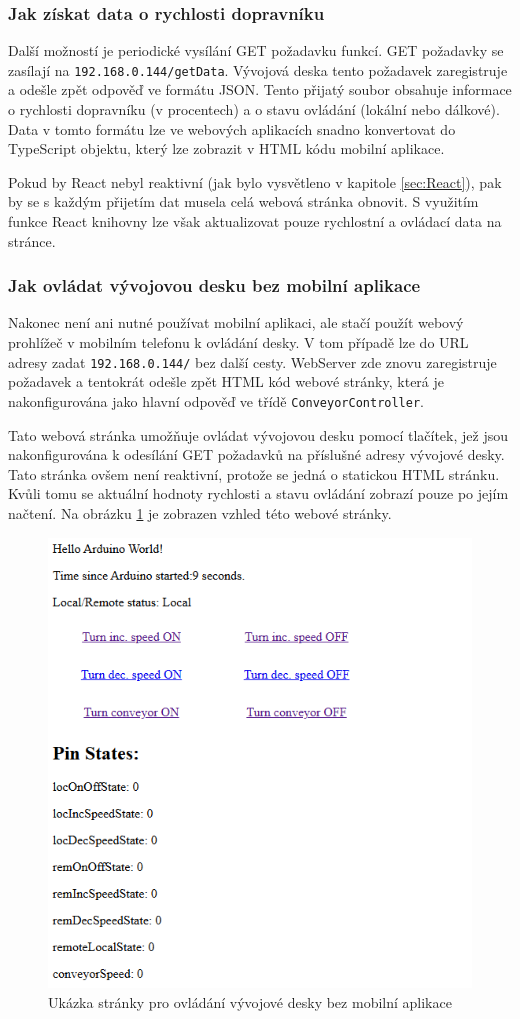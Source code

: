 \subsubsection{Jak získat data o rychlosti dopravníku}
Další možností je periodické vysílání GET požadavku funkcí. GET požadavky se zasílají na \texttt{192.168.0.144/getData}. Vývojová deska tento požadavek zaregistruje a odešle zpět odpověď ve formátu JSON. Tento přijatý soubor obsahuje informace o rychlosti dopravníku (v procentech) a o stavu ovládání (lokální nebo dálkové). Data v tomto formátu lze ve webových aplikacích snadno konvertovat do TypeScript objektu, který lze zobrazit v HTML kódu mobilní aplikace.

Pokud by React nebyl reaktivní (jak bylo vysvětleno v kapitole \ref{sec:React}), pak by se s každým přijetím dat musela celá webová stránka obnovit. S využitím funkce React knihovny lze však aktualizovat pouze rychlostní a ovládací data na stránce.

\subsubsection{Jak ovládat vývojovou desku bez mobilní aplikace}\label{sec:JakOvladatBezMobilniAplikace}
Nakonec není ani nutné používat mobilní aplikaci, ale stačí použít webový prohlížeč v mobilním telefonu k ovládání desky. V tom případě lze do URL adresy zadat \texttt{192.168.0.144/} bez další cesty. WebServer zde znovu zaregistruje požadavek a tentokrát odešle zpět HTML kód webové stránky, která je nakonfigurována jako hlavní odpověď ve třídě \texttt{ConveyorController}.

Tato webová stránka umožňuje ovládat vývojovou desku pomocí tlačítek, jež jsou nakonfigurována k odesílání GET požadavků na příslušné adresy vývojové desky. Tato stránka ovšem není reaktivní, protože se jedná o statickou HTML stránku. Kvůli tomu se aktuální hodnoty rychlosti a stavu ovládání zobrazí pouze po jejím načtení. Na obrázku \ref{fig:WebServerLandingPage} je zobrazen vzhled této webové stránky.

\begin{figure}[hptb]
	\centering
	\includegraphics[width=0.6\linewidth]{images/WebServerLandingPage.png}
	\caption{Ukázka stránky pro ovládání vývojové desky bez mobilní aplikace}
	\label{fig:WebServerLandingPage}
\end{figure}

